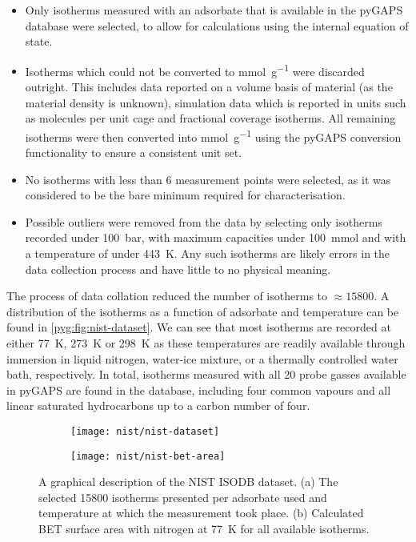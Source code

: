\begin{itemize}
	\item Only isotherms measured with an adsorbate that is available
	      in the pyGAPS database were selected, to allow for calculations
	      using the internal equation of state.
	\item Isotherms which could not be converted to \si{\milli\mol\per\gram}
	      were discarded outright. This includes data reported
	      on a volume basis of material (as the material density is
	      unknown), simulation data which is reported in units such
	      as molecules per unit cage and fractional coverage isotherms.
	      All remaining isotherms were then converted into
	      \si{\milli\mol\per\gram} using the pyGAPS conversion
	      functionality to ensure a consistent unit set.
	\item No isotherms with less than 6 measurement points were
	      selected, as it was considered to be the bare
	      minimum required for characterisation.
	\item Possible outliers were removed from the data by selecting
	      only isotherms recorded under \SI{100}{\bar}, with maximum capacities
	      under \SI{100}{\milli\mol} and with a temperature of under
	      \SI{443}{\kelvin}. Any such isotherms are likely errors in the
	      data collection process and have little to no physical meaning.
\end{itemize}

The process of data collation reduced the number of isotherms
to \(\approx \! 15800\). A distribution of the isotherms as a
function of adsorbate and temperature can be found
in \autoref{pyg:fig:nist-dataset}.
We can see that most isotherms are recorded at either
\SI{77}{\kelvin}, \SI{273}{\kelvin} or \SI{298}{\kelvin} as
these temperatures are readily available through immersion
in liquid nitrogen, water-ice mixture, or a thermally controlled
water bath, respectively. In total, isotherms measured with all 20
probe gasses available in pyGAPS are found in the database,
including four common vapours and all linear saturated hydrocarbons
up to a carbon number of four.

\begin{figure}[htb]
	\centering

	\begin{subfigure}[b]{0.5\linewidth}
		\texttt{[image: nist/nist-dataset]}%
		\caption{}%
		\label{pyg:fig:nist-dataset}
	\end{subfigure}%
	\begin{subfigure}[b]{0.45\linewidth}
		\texttt{[image: nist/nist-bet-area]}%
		\caption{}%
		\label{pyg:fig:nist-dataset-area}
	\end{subfigure}%

	\caption{A graphical description of the NIST ISODB dataset.
		(a) The selected 15800 isotherms presented per adsorbate used
		and temperature at which the measurement took place.
		(b) Calculated \gls{BET} surface area with nitrogen at \SI{77}{\kelvin}
		for all available isotherms. }%
	\label{pyg:fig:nist-set}
\end{figure}

